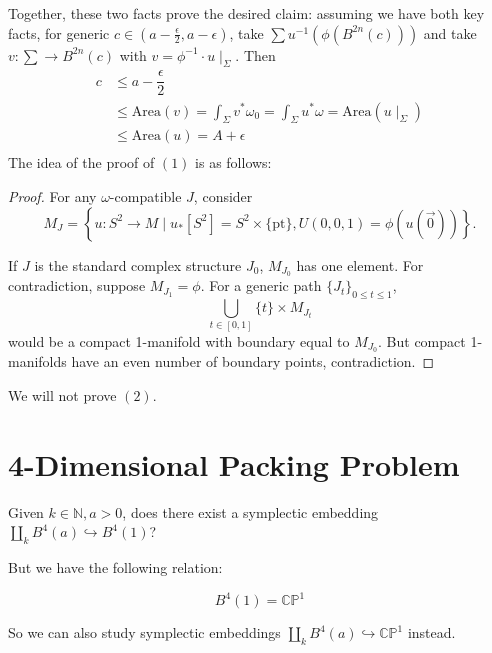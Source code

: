 Together, these two facts prove the desired claim: assuming we have both key facts, for generic $c \in (a-\frac{\epsilon}{2}, a-\epsilon)$, take $\sum u^{-1}(\phi(B^{2n}(c)))$ and take $v:\sum \to B^{2n}(c)$ with $v= \phi^{-1} \cdot u\mid_\Sigma$. Then
\begin{align*}
c&\le a-\dfrac{\epsilon}{2} \\
&\le \text{Area}(v) = \int_\Sigma v^*\omega_0= \int_\Sigma u^*\omega=\text{Area}(u\mid_\Sigma) \\
& \le \text{Area}(u) = A+\epsilon \\
\end{align*}
The idea of the proof of $(1)$ is as follows:

\begin{proof}
For any $\omega$-compatible $J$, consider 
\[
M_J = \left\{ u:S^2 \to M \mid  u_*[S^2]=S^2 \times \{ \text{pt}\}, U(0,0,1) = \phi\left(u\left(\vec{0}\right)\right)\right\}.
\]

If $J$ is the standard complex structure $J_0$, $M_{J_0}$ has one element. For contradiction, suppose $M_{J_1} = \phi$. For a generic path $\{J_t\}_{0\le t \le 1}$,
\[
\bigcup_{t\in [0,1]} \{t\}\times M_{J_t}
\]
would be a compact 1-manifold with boundary equal to $M_{J_0}$. But compact 1-manifolds have an even number of boundary points, contradiction.
\end{proof}

We will not prove $(2)$.

\section{4-Dimensional Packing Problem}

\begin{problem}

Given $k\in \mathbb{N}, a>0$, does there exist a symplectic embedding $\amalg_k B^4(a) \hookrightarrow B^4(1)$?

\end{problem}

But we have the following relation:

\begin{proposition}

\[
B^4(1) = \mathbb{CP}^1
\]

\end{proposition}

So we can also study symplectic embeddings $\amalg_k B^4(a) \hookrightarrow \mathbb{CP}^1$ instead.

